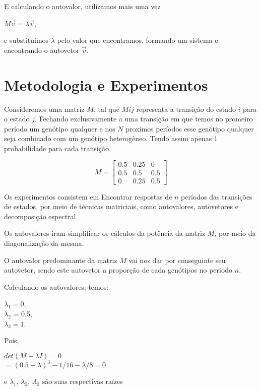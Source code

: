 \documentclass[a4paper,12pt]{article}
\begin{document}
E calculando o autovalor, utilizamos mais uma vez\\
\begin{center}
    $M \vec{v} = \lambda \vec{v}$,
\end{center}
e substituimos $\lambda$ pelo valor que encontramos, formando um sistema e encontrando o autovetor $\vec{v}$.

\section{Metodologia e Experimentos}
\label{sec:metodologia}


Consideremos uma matriz $M$, tal que $Mij$ representa a transição do estado $i$ para o estado $j$. Fechando exclusivamente a uma transição em que temos no promeiro período um genótipo qualquer e nos $N$ proxímos períodos esse genótipo qualquer seja combinado com um genótipo heterogêneo. Tendo assim apenas 1 probabilidade para cada transição. 

\begin{displaymath}
M = \begin{bmatrix}
0.5&0.25&0\\
0.5&0.5&0.5\\
0&0.25&0.5
\end{bmatrix}
\end{displaymath}

Os experimentos consistem em Encontrar respostas de $n$ períodos das transições de estados, por meio de técnicas matriciais, como autovalores, autovetores e decomposição espectral.

Os autovalores iram simplificar os cálculos da potência da matriz $M$, por meio da diagonalização da mesma. 

O autovalor predominante da matriz $M$ vai nos dar por conseguinte seu autovetor, sendo este autovetor a proporção de cada genótipos no periodo $n$.

Calculando os autovalores, temos:
\begin{center}
    $\lambda_1 = 0$,\\ $\lambda_2$ = 0.5,\\ $\lambda_3 = 1$.
\end{center}

Pois,
\begin{center}
    $det(M-\lambda I) = 0$\\
    $= (0.5 - \lambda)^3 - 1/16 - \lambda/8 = 0$
\end{center}
e $\lambda_1$, $\lambda_2$, $\Lambda_3$ são suas respectivas raízes
\end{document}
